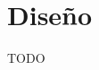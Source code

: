 \documentclass[letterpaper,10pt]{article}
\begin{document}
	\newpage

	\section{Diseño}

	TODO

\end{document}
